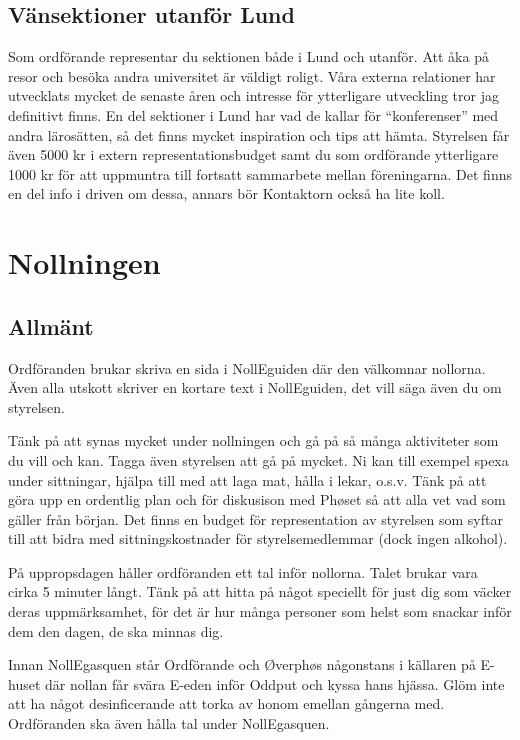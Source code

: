 \documentclass[10pt]{article}
\begin{document}
    \subsection{Vänsektioner utanför Lund}

    Som ordförande representar du sektionen både i Lund och utanför. Att åka på resor och besöka andra universitet är väldigt roligt. Våra externa relationer har utvecklats mycket de senaste åren och intresse för ytterligare utveckling tror jag definitivt finns. En del sektioner i Lund har vad de kallar för ``konferenser'' med andra lärosätten, så det finns mycket inspiration och tips att hämta. Styrelsen får även 5000 kr i extern representationsbudget samt du som ordförande ytterligare 1000 kr för att uppmuntra till fortsatt sammarbete mellan föreningarna. Det finns en del info i driven om dessa, annars bör Kontaktorn också ha lite koll.  

    \section{Nollningen}
    
    \subsection{Allmänt}
       
    Ordföranden brukar skriva en sida i NollEguiden där den välkomnar nollorna. Även alla utskott skriver en kortare text i NollEguiden, det vill säga även du om styrelsen.
    
    Tänk på att synas mycket under nollningen och gå på så många aktiviteter som du vill och kan. Tagga även styrelsen att gå på mycket. Ni kan till exempel spexa under sittningar, hjälpa till med att laga mat, hålla i lekar, o.s.v. Tänk på att göra upp en ordentlig plan och för diskusison med Ph\o set så att alla vet vad som gäller från början. Det finns en budget för representation av styrelsen som syftar till att bidra med sittningskostnader för styrelsemedlemmar (dock ingen alkohol).
    
    På uppropsdagen håller ordföranden ett tal inför nollorna. Talet brukar vara cirka 5 minuter långt. Tänk på att hitta på något speciellt för just dig som väcker deras uppmärksamhet, för det är hur många personer som helst som snackar inför dem den dagen, de ska minnas dig.
    
    Innan NollEgasquen står Ordförande och \O verph\o s någonstans i källaren på E-huset där nollan får svära E-eden inför Oddput och kyssa hans hjässa. Glöm inte att ha något desinficerande att torka av honom emellan gångerna med. Ordföranden ska även hålla tal under NollEgasquen.
    
\end{document}
